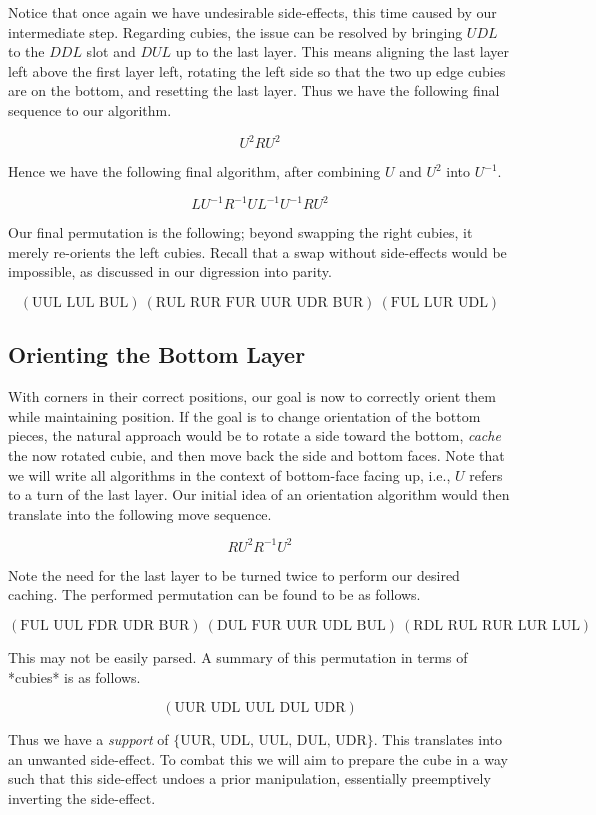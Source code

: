 \documentclass{article}
\begin{document}
Notice that once again we have undesirable side-effects, this time caused by 
our intermediate step. Regarding cubies, the issue can be resolved by 
bringing $UDL$ to the $DDL$ slot and $DUL$ up to the last layer. This means 
aligning the last layer left above the first layer left, rotating the left 
side so that the two up edge cubies are on the bottom, and resetting the last 
layer. Thus we have the following final sequence to our algorithm.

$$U^2 R U^2$$

Hence we have the following final algorithm, after combining $U$ and $U^2$ 
into $U^{-1}$.

$$L U^{-1} R^{-1} U L^{-1} U^{-1} R U^2$$

Our final permutation is the following; beyond swapping the right cubies, it 
merely re-orients the left cubies. Recall that a swap without side-effects 
would be impossible, as discussed in our digression into parity.

$$(\text{UUL LUL BUL})\ (\text{RUL RUR FUR UUR UDR BUR})\ (\text{FUL LUR UDL})$$

\subsection{Orienting the Bottom Layer}
With corners in their correct positions, our goal is now to correctly orient 
them while maintaining position. If the goal is to change orientation of the 
bottom pieces, the natural approach would be to rotate a side toward the 
bottom, \emph{cache} the now rotated cubie, and then move back the side and 
bottom faces. Note that we will write all algorithms in the context of 
bottom-face facing up, i.e., $U$ refers to a turn of the last layer. Our 
initial idea of an orientation algorithm would then translate into the 
following move sequence. 

$$R U^2 R^{-1} U^2$$

Note the need for the last layer to be turned twice to perform our desired 
caching. The performed permutation can be found to be as follows. 

$$(\text{FUL UUL FDR UDR BUR})\ (\text{DUL FUR UUR UDL BUL})\ (\text{RDL RUL RUR LUR LUL})$$

This may not be easily parsed. A summary of this permutation in terms of 
*cubies* is as follows.

$$(\text{UUR UDL UUL DUL UDR})$$

Thus we have a \emph{support} of $\{ \text{UUR, UDL, UUL, DUL, UDR} \}$. This 
translates into an unwanted side-effect. To combat this we will aim to 
prepare the cube in a way such that this side-effect undoes a prior 
manipulation, essentially preemptively inverting the side-effect.
\end{document}
